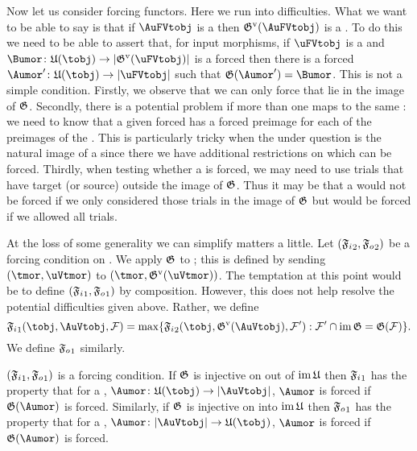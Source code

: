 \documentclass[%
12pt,%
arxiv,%
defaults
]{myclass}
\begin{document}
Now let us consider forcing functors.
Here we run into difficulties.
What we want to be able to say is that if \(\AuFVtobj\) is a \AuFVtobj then \(\mVo{\subfunc}(\AuFVtobj)\) is a \BuFVtobj.
To do this we need to be able to assert that, for input morphisms, if \(\uFVtobj\) is a \AuFVtobj and \(\Bumor \colon \ufunc(\tobj) \to \sabs{\mVo{\subfunc}(\uFVtobj)}\) is a forced \Bumor then there is a forced \Aumor \(\Aumor' \colon \ufunc(\tobj) \to \sabs{\uFVtobj}\) such that \(\subfunc(\Aumor') = \Bumor\).
This is not a simple condition.
Firstly, we observe that we can only force \Aumors that lie in the image of \(\subfunc\).
Secondly, there is a potential problem if more than one \AuFVtobj maps to the same \BuVtobj: we need to know that a given forced \Bumor has a forced preimage for each of the preimages of the \BuVtobj.
This is particularly tricky when the \BuVtobj under question is the natural image of a \tobj since there we have additional restrictions on which \Bumors can be forced.
Thirdly, when testing whether a \Bumor is forced, we may need to use trials that have target (or source) outside the image of \(\subfunc\).
Thus it may be that a \Bumor would not be forced if we only considered those trials in the image of \(\subfunc\) but would be forced if we allowed all trials.

At the loss of some generality we can simplify matters a little.
Let \((\mBo{\iforce}, \mBo{\oforce})\) be a forcing condition on \BuVtcat.
We apply \(\subfunc\) to \rcat; this is defined by sending \((\tmor, \uVtmor)\) to \((\tmor, \mVo{\subfunc}(\uVtmor))\).
The temptation at this point would be to define \((\mAo{\iforce}, \mAo{\oforce})\) by composition.
However, this does not help resolve the potential difficulties given above.
Rather, we define
%
\[
  \mAo{\iforce}(\tobj, \AuVtobj, \m{F}) = \max\{\mBo{\iforce}(\tobj, \mVo{\subfunc}(\AuVtobj), \m{F}') : \m{F}' \cap \im \subfunc = \subfunc(\m{F}) \}.
\]
%
We define \(\mAo{\oforce}\) similarly.

\begin{lemma}
\label{lem:injforce}
\((\mAo{\iforce}, \mAo{\oforce})\) is a forcing condition.
If \(\subfunc\) is injective on \Aumors out of \(\im \ufunc\) then \(\mAo{\iforce}\) has the property that for a \Aumor, \(\Aumor \colon \ufunc(\tobj) \to \forfunc[\AuVtobj]\), \(\Aumor\) is forced if \(\subfunc(\Aumor)\) is forced.
Similarly, if \(\subfunc\) is injective on \Aumors into \(\im \ufunc\) then \(\mAo{\oforce}\) has the property that for a \Aumor, \(\Aumor \colon \forfunc[\AuVtobj] \to \ufunc(\tobj)\), \(\Aumor\) is forced if \(\subfunc(\Aumor)\) is forced.
\end{lemma}
\end{document}

